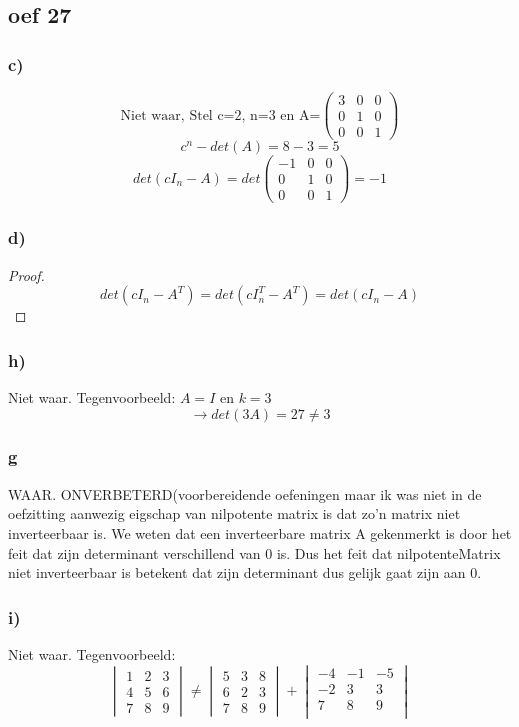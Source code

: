 \documentclass[lineaire_algebra_oplossingen.tex]{subfiles}
\begin{document}
\subsection{oef 27}
\subsubsection*{c)}
\[ \text{Niet waar, Stel c=2, n=3 en A=}
\begin{pmatrix}
3 & 0 & 0\\
0 & 1 & 0\\
0 & 0 & 1
\end{pmatrix} 
\]
\[c^{n}-det(A) = 8 - 3 = 5\]
\[ det (cI_{n}-A) = det
\begin{pmatrix}
-1 & 0 & 0 \\
0 & 1 & 0\\
0 & 0 & 1
\end{pmatrix}
= -1\]

\subsubsection*{d)}
\begin{proof}
\[
det(cI_n - A^T) = det(cI_n^T - A^T) = det(cI_n - A)
\]
\end{proof}

\subsubsection*{h)}
Niet waar. Tegenvoorbeeld: $A=I$ en $k=3$
\[
\rightarrow det(3A) = 27 \neq 3
\]
\subsubsection*{g}
 WAAR. ONVERBETERD(voorbereidende oefeningen maar ik was niet in de oefzitting aanwezig
eigschap van nilpotente matrix is dat zo'n matrix niet inverteerbaar is. We weten dat een inverteerbare matrix A gekenmerkt is door het feit dat zijn determinant verschillend van 0 is. Dus het feit dat 
nilpotenteMatrix niet inverteerbaar is betekent dat zijn determinant dus gelijk gaat zijn aan 0.
\subsubsection*{i)}
Niet waar. Tegenvoorbeeld: 
\[
    \begin{vmatrix}
        1 & 2 & 3\\
        4 & 5 & 6\\
        7 & 8 & 9
    \end{vmatrix} \neq
    \begin{vmatrix}
        5 & 3 & 8\\
        6 & 2 & 3\\
        7 & 8 & 9
    \end{vmatrix} + 
    \begin{vmatrix}
        -4 & -1 & -5\\
        -2 & 3 & 3\\
        7 & 8 & 9\\
    \end{vmatrix}
\]
\end{document}
